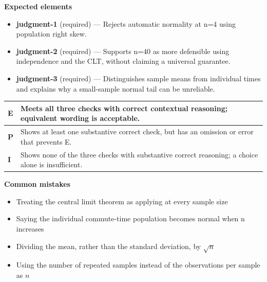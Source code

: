 \documentclass[11pt]{article}
\begin{document}

\textbf{Expected elements}
\begin{itemize}[leftmargin=1.5em,itemsep=2pt,topsep=2pt]
  \item \textbf{judgment-1} (required) --- Rejects automatic normality at n=4 using population right skew.
  \item \textbf{judgment-2} (required) --- Supports n=40 as more defensible using independence and the CLT, without claiming a universal guarantee.
  \item \textbf{judgment-3} (required) --- Distinguishes sample means from individual times and explains why a small-sample normal tail can be unreliable.
\end{itemize}

{\small\renewcommand{\arraystretch}{1.25}
\noindent\begin{tabular}{|p{0.5in}|p{5.9in}|}
\hline
\textbf{E} & Meets all three checks with correct contextual reasoning; equivalent wording is acceptable. \\ \hline
\textbf{P} & Shows at least one substantive correct check, but has an omission or error that prevents E. \\ \hline
\textbf{I} & Shows none of the three checks with substantive correct reasoning; a choice alone is insufficient. \\ \hline
\end{tabular}}

\textbf{Common mistakes}
\begin{itemize}[leftmargin=1.5em,itemsep=2pt,topsep=2pt]
  \item Treating the central limit theorem as applying at every sample size
  \item Saying the individual commute-time population becomes normal when n increases
  \item Dividing the mean, rather than the standard deviation, by $\sqrt{n}$
  \item Using the number of repeated samples instead of the observations per sample as $n$
\end{itemize}

\clearpage
{}
\end{document}

